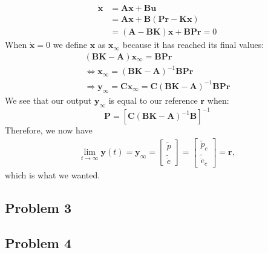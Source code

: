 \begin{align*}
  \dot{\boldsymbol{x}} &= \boldsymbol{Ax} + \boldsymbol{Bu} \\
                       &= \boldsymbol{Ax} +
                         \boldsymbol{B}(\boldsymbol{Pr} -
                         \boldsymbol{Kx}) \\
											 &= (\boldsymbol{A}-\boldsymbol{BK})\boldsymbol{x}
												+ \boldsymbol{BPr} = 0
\end{align*}
When $\boldsymbol{\dot{x}} = 0$ we define $\boldsymbol{x}$ as $\boldsymbol{x_\infty}$ because it has reached its final values:
\begin{align*}
(\boldsymbol{BK} - \boldsymbol{A})\boldsymbol{x_\infty} = \boldsymbol{BPr} \\
\Leftrightarrow \boldsymbol{x_\infty} = (\boldsymbol{BK} - \boldsymbol{A})^{-1}\boldsymbol{BPr} \\
\Rightarrow \boldsymbol{y_\infty} = \boldsymbol{Cx_\infty} = \boldsymbol{C}(\boldsymbol{BK} - \boldsymbol{A})^{-1}\boldsymbol{BPr}
\end{align*}
We see that our output $\boldsymbol{y_\infty}$ is equal to our reference $\boldsymbol{r}$ when:
\begin{equation}
\boldsymbol{P} = [\boldsymbol{C}(\boldsymbol{BK} - \boldsymbol{A})^{-1}\boldsymbol{B}]^{-1}
\end{equation}
Therefore, we now have
\begin{align*}
\lim_{t\to\infty}\boldsymbol{y}(t) = \boldsymbol{y_\infty} =
\begin{bmatrix}
\tilde{p} \\
\tilde{\dot{e}}
\end{bmatrix}
= 
\begin{bmatrix}
\tilde{p}_c \\
\tilde{\dot{e}}_c
\end{bmatrix}
= \boldsymbol{r},
\end{align*}
which is what we wanted.
\subsection{Problem 3}
\subsection{Problem 4}
